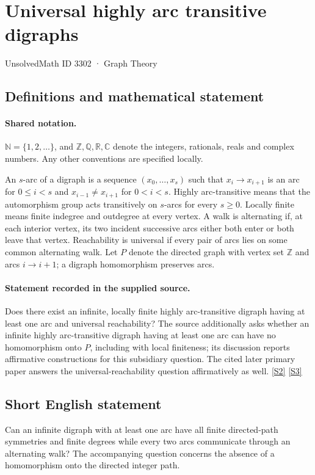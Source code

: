 \documentclass[11pt]{article}
\newcommand{\sref}[2]{\hyperlink{source:#1:#2}{[S#2]}}
\begin{document}
\setcounter{section}{3301}
\section{Universal highly arc transitive digraphs}\label{3302}
{\small\sffamily UnsolvedMath ID 3302 · Graph Theory}
\subsection{Definitions and mathematical statement}

\paragraph{Shared notation.}$\mathbb N=\{1,2,\ldots\}$, and $\mathbb Z,\mathbb Q,\mathbb R,\mathbb C$ denote the integers, rationals, reals and complex numbers. Any other conventions are specified locally.


An $s$-arc of a digraph is a sequence $(x_0,\ldots,x_s)$ such that $x_i\to x_{i+1}$ is an arc for $0\leq i<s$ and $x_{i-1}\ne x_{i+1}$ for $0<i<s$. Highly arc-transitive means that the automorphism group acts transitively on $s$-arcs for every $s\geq0$. Locally finite means finite indegree and outdegree at every vertex. A walk is alternating if, at each interior vertex, its two incident successive arcs either both enter or both leave that vertex. Reachability is universal if every pair of arcs lies on some common alternating walk. Let $P$ denote the directed graph with vertex set $\mathbb Z$ and arcs $i\to i+1$; a digraph homomorphism preserves arcs.
\paragraph{Statement recorded in the supplied source.}
Does there exist an infinite, locally finite highly arc-transitive digraph having at least one arc and universal reachability? The source additionally asks whether an infinite highly arc-transitive digraph having at least one arc can have no homomorphism onto $P$, including with local finiteness; its discussion reports affirmative constructions for this subsidiary question. The cited later primary paper answers the universal-reachability question affirmatively as well. \sref{3302}{2} \sref{3302}{3}
\subsection{Short English statement}
Can an infinite digraph with at least one arc have all finite directed-path symmetries and finite degrees while every two arcs communicate through an alternating walk? The accompanying question concerns the absence of a homomorphism onto the directed integer path.
\end{document}
